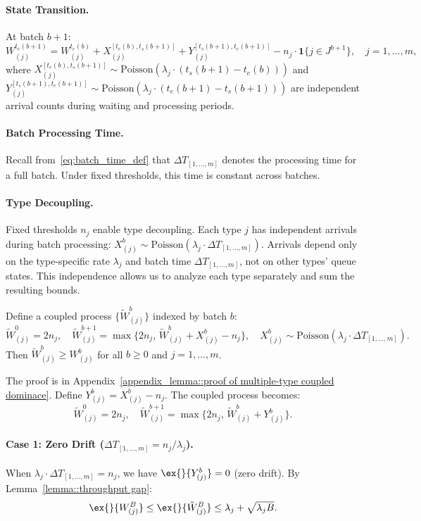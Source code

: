 \paragraph{State Transition.} At batch $b+1$:
$$W_{(j)}^{t_e(b+1)}=W_{(j)}^{t_e(b)}+X_{(j)}^{[t_e(b), t_s(b+1)]}+Y_{(j)}^{[t_s(b+1), t_e(b+1)]}- n_j\cdot \mathbf{1}\{j\in J^{b+1}\},\quad j=1,\ldots,m,$$
where $X_{(j)}^{[t_e(b), t_s(b+1)]} \sim \text{Poisson}(\lambda_j \cdot (t_s(b+1)-t_e(b)))$ and $Y_{(j)}^{[t_s(b+1), t_e(b+1)]} \sim \text{Poisson}(\lambda_j \cdot (t_e(b+1)-t_s(b+1)))$ are independent arrival counts during waiting and processing periods.

\paragraph{Batch Processing Time.} Recall from~\eqref{eq:batch_time_def} that $\Delta T_{[1,\ldots,m]}$ denotes the processing time for a full batch. Under fixed thresholds, this time is constant across batches.

\paragraph{Type Decoupling.}
Fixed thresholds $n_j$ enable type decoupling. Each type $j$ has independent arrivals during batch processing: $X^b_{(j)} \sim \text{Poisson}(\lambda_j \cdot \Delta T_{[1,\ldots,m]})$. Arrivals depend only on the type-specific rate $\lambda_j$ and batch time $\Delta T_{[1,\ldots,m]}$, not on other types' queue states. This independence allows us to analyze each type separately and sum the resulting bounds.

\begin{lemma}\label{lemma::multiple-type coupled dominace}
Define a coupled process $\{\tilde{W}^b_{(j)}\}$ indexed by batch $b$:
$$\tilde{W}_{(j)}^0=2n_j, \quad \tilde{W}_{(j)}^{b+1}= \max\{ 2n_j,\, \tilde{W}_{(j)}^b +X_{(j)}^b-n_j \},\quad X^b_{(j)} \sim \text{Poisson}(\lambda_j\cdot \Delta T_{[1,\ldots,m]}).$$
Then $\tilde{W}^b_{(j)}\geq W^b_{(j)}$ for all $b\geq 0$ and $j=1,\ldots,m$.
\end{lemma}
\noindent The proof is in Appendix~\ref{appendix_lemma::proof of multiple-type coupled dominace}. Define $Y^b_{(j)} = X^b_{(j)} - n_j$. The coupled process becomes:
$$\tilde{W}^0_{(j)} = 2n_j,\quad \tilde{W}^{b+1}_{(j)} = \max\{ 2n_j, \, \tilde{W}^b_{(j)}+Y^b_{(j)} \}.$$

\paragraph{Case 1: Zero Drift ($\Delta T_{[1,\ldots,m]} = n_j/\lambda_j$).} When $\lambda_j\cdot \Delta T_{[1,\ldots,m]} = n_j$, we have $\ex{}{Y^b_{(j)}}=0$ (zero drift). By Lemma~\ref{lemma::throughput gap}:
$$\ex{}{W^B_{(j)}}\leq \ex{}{\tilde{W}^B_{(j)}}\leq \lambda_j + \sqrt{\lambda_j B}.$$

